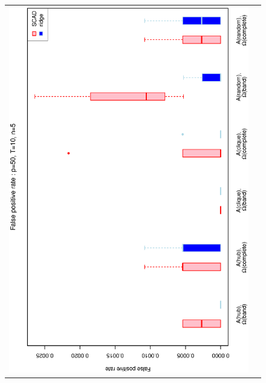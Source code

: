 \documentclass[a4paper]{article}
\begin{document}
\begin{figure}[h!]
\centering
\begin{tabular}{cc}
\includegraphics[scale=0.45,angle=270]{ROCfpr50T10N5_25.eps}
\\

\end{tabular}
\end{figure}
\end{document}
